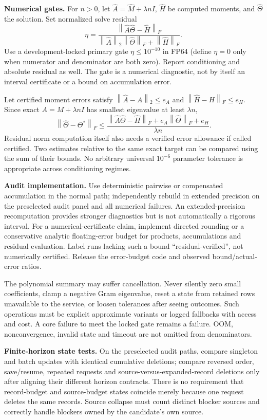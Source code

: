 \documentclass[11pt,a4paper]{article}
\newcommand{\norm}[1]{\left\lVert #1\right\rVert}
\begin{document}
\textbf{Numerical gates.} For $n>0$, let $\widehat A=\widehat M+\lambda nI$, $\widehat H$ be computed moments, and $\widehat\Theta$ the solution. Set normalized solve residual
\[
 \eta=\frac{\norm{\widehat A\widehat\Theta-\widehat H}_F}
 {\norm{\widehat A}_2\norm{\widehat\Theta}_F+\norm{\widehat H}_F}.
\]
Use a development-locked primary gate $\eta\le10^{-10}$ in FP64 (define $\eta=0$ only when numerator and denominator are both zero). Report conditioning and absolute residual as well. The gate is a numerical diagnostic, not by itself an interval certificate or a bound on accumulation error.

Let certified moment errors satisfy $\norm{\widehat A-A}_2\le e_A$ and $\norm{\widehat H-H}_F\le e_H$. Since exact $A=M+\lambda nI$ has smallest eigenvalue at least $\lambda n$,
\[
 \norm{\widehat\Theta-\Theta^*}_F
 \le \frac{\norm{\widehat A\widehat\Theta-\widehat H}_F
                 + e_A\norm{\widehat\Theta}_F+e_H}{\lambda n}.
\]
Residual norm computation itself also needs a verified error allowance if called certified. Two estimates relative to the same exact target can be compared using the sum of their bounds. No arbitrary universal $10^{-6}$ parameter tolerance is appropriate across conditioning regimes.

\textbf{Audit implementation.} Use deterministic pairwise or compensated accumulation in the normal path; independently rebuild in extended precision on the preselected audit panel and all numerical failures. An extended-precision recomputation provides stronger diagnostics but is not automatically a rigorous interval. For a numerical-certificate claim, implement directed rounding or a conservative analytic floating-error budget for products, accumulations and residual evaluation. Label runs lacking such a bound ``residual-verified'', not numerically certified. Release the error-budget code and observed bound/actual-error ratios.

The polynomial summary may suffer cancellation. Never silently zero small coefficients, clamp a negative Gram eigenvalue, reset a state from retained rows unavailable to the service, or loosen tolerances after seeing outcomes. Such operations must be explicit approximate variants or logged fallbacks with access and cost. A core failure to meet the locked gate remains a failure. OOM, nonconvergence, invalid state and timeout are not omitted from denominators.

\textbf{Finite-horizon state tests.} On the preselected audit paths, compare singleton and batch updates with identical cumulative deletions; compare reversed order, save/resume, repeated requests and source-versus-expanded-record deletions only after aligning their different horizon contracts. There is no requirement that record-budget and source-budget states coincide merely because one request deletes the same records. Source collapse must count distinct blocker sources and correctly handle blockers owned by the candidate's own source.
\end{document}
